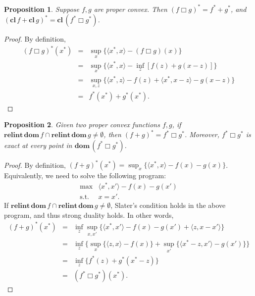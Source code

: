 \documentclass[openany]{book}
\newtheorem{proposition}{Proposition}[chapter]
\theoremstyle{definition}
\theoremstyle{remark}
\begin{document}
\begin{proposition}
    Suppose $f,g$ are proper convex. Then $(f\Box g)^*=f^*+g^*$, and $(\mathbf{cl}\,f+\mathbf{cl}\,g)^*=\mathbf{cl}\,(f^*\Box g^*)$.
\end{proposition}
\begin{proof}
    By definition,
    \begin{equation}
        \begin{array}{rcl}
            (f\Box g)^*(x^*) & = & \sup_{x}\{\langle x^*,x\rangle-(f\Box g)(x)\} \\
             & = & \sup_{x}\{\langle x^*,x\rangle-\inf_{z}[f(z)+g(x-z)]\} \\
             & = & \sup_{x,z}\{\langle x^*,z\rangle-f(z)+\langle x^*,x-z\rangle-g(x-z)\} \\
             & = & f^*(x^*)+g^*(x^*).
        \end{array}
    \end{equation}
\end{proof}
\begin{proposition}
    Given two proper convex functions $f,g$, if $\mathbf{relint}\,\mathbf{dom }\,f\cap \mathbf{relint}\,\mathbf{dom }\,g\ne\emptyset$, then $(f+g)^*=f^*\Box g^*$. Moreover, $f^*\Box g^*$ is exact at every point in $\mathbf{dom}\,(f^*\Box g^*)$.
\end{proposition}
\begin{proof}
    By definition, $(f+g)^*(x^*)=\sup_{x}\{\langle x^*,x\rangle-f(x)-g(x)\}$. Equivalently, we need to solve the following program:
    \begin{equation}
        \begin{array}{rl}
            \max & \langle x^*,x'\rangle-f(x)-g(x') \\
            \mathrm{s.t.} & x=x'.
        \end{array}
    \end{equation}
    If $\mathbf{relint}\,\mathbf{dom }\,f\cap \mathbf{relint}\,\mathbf{dom }\,g\ne\emptyset$, Slater's condition holds in the above program, and thus strong duality holds. In other words,
    \begin{equation}
        \begin{array}{rcl}
            (f+g)^*(x^*) & = & \inf_{z}\sup_{x,x'}\{\langle x^*,x'\rangle-f(x)-g(x')+\langle z,x-x'\rangle\} \\
             & = & \inf_{z}\{\sup_{x}\{\langle z,x\rangle-f(x)\}+\sup_{x'}\{\langle x^*-z,x'\rangle-g(x')\}\} \\
             & = & \inf_{z}\{f^*(z)+g^*(x^*-z)\} \\
             & = & (f^*\Box g^*)(x^*).
        \end{array}
    \end{equation}
\end{proof}
\end{document}
